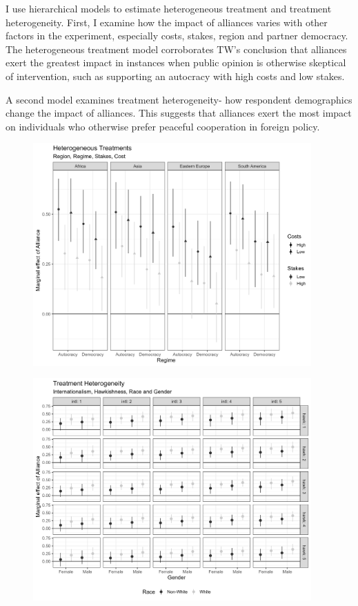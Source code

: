 \documentclass[12pt]{article}
\begin{document}
I use hierarchical models to estimate heterogeneous treatment and treatment heterogeneity. 
First, I examine how the impact of alliances varies with other factors in the experiment, especially costs, stakes, region and partner democracy.
The heterogeneous treatment model corroborates TW's conclusion that alliances exert the greatest impact in instances when public opinion is otherwise skeptical of intervention, such as supporting an autocracy with high costs and low stakes.  


A second model examines treatment heterogeneity- how respondent demographics change the impact of alliances. 
This suggests that alliances exert the most impact on individuals who otherwise prefer peaceful cooperation in foreign policy.  




\begin{figure}[htpb]
	\centering
		\includegraphics[width=0.95\textwidth]{../figures/tw-het-treat.png}
	\caption{}
	\label{fig:tw-het-treat}
\end{figure}



\begin{figure}[htpb]
	\centering
		\includegraphics[width=0.95\textwidth]{../figures/tw-treat-het.png}
	\caption{}
	\label{fig:tw-het-treat}
\end{figure}
\end{document}
